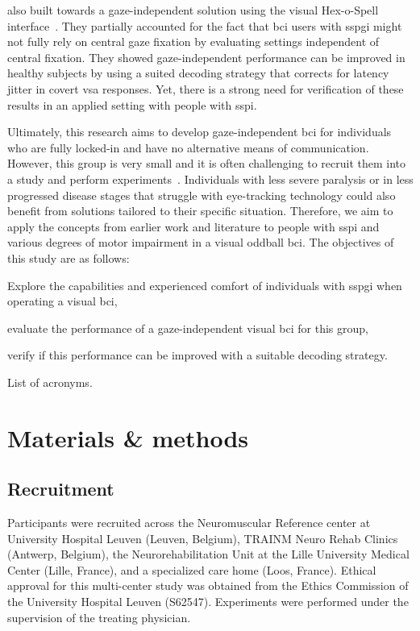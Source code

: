 \documentclass[twocolumn]{article}
\begin{document}
\textcite{VanDenKerchove2024} also built towards a gaze-independent solution
using the visual Hex-o-Spell interface~\cite{VanDenKerchove2024}.
They partially accounted for the fact that \ac{bci} users with \ac{sspgi} might
not fully rely on central gaze fixation by evaluating settings independent of
central fixation.
They showed gaze-independent performance can be improved in healthy subjects by
using a suited decoding strategy that corrects for latency jitter in covert \ac{vsa} responses.
Yet, there is a strong need for verification of these results in an applied
setting with people with \ac{sspi}.

Ultimately, this research aims to develop gaze-independent \ac{bci} for
individuals who are fully locked-in and have no alternative means of communication.
However, this group is very small and it is often challenging to recruit them
into a study and perform experiments~\cite{Wolpaw2006}.
Individuals with less severe paralysis or in less progressed disease stages that struggle with
eye-tracking technology could also benefit from
solutions tailored to their specific situation.
Therefore, we aim to apply the concepts from earlier work and literature to
people with \ac{sspi} and various degrees of motor impairment in a visual oddball
\ac{bci}.
The objectives of this study are as follows:
\begin{enumerate*}[label={(\arabic*)}]
  \item Explore the capabilities and experienced comfort of individuals with
    \ac{sspgi} when operating a visual \ac{bci},
  \item evaluate the performance of a gaze-independent visual \ac{bci} for this
    group,
  \item verify if this performance can be improved with a suitable decoding
    strategy.
\end{enumerate*}

\begin{table}
  \footnotesize
  \printacronyms[template=tabular, heading=none]
  \caption{List of acronyms.}
\end{table}


\section{Materials \& methods}
\subsection{Recruitment}
Participants were recruited across the Neuromuscular Reference center at
University Hospital Leuven (Leuven, Belgium), TRAINM Neuro Rehab Clinics
(Antwerp, Belgium), the Neurorehabilitation Unit at the Lille University
Medical Center (Lille, France), and a specialized care home (Loos,
France).
Ethical approval for this multi-center study was obtained from the Ethics
Commission of the University Hospital Leuven (S62547).
Experiments were performed under the supervision of the treating physician.
\end{document}
